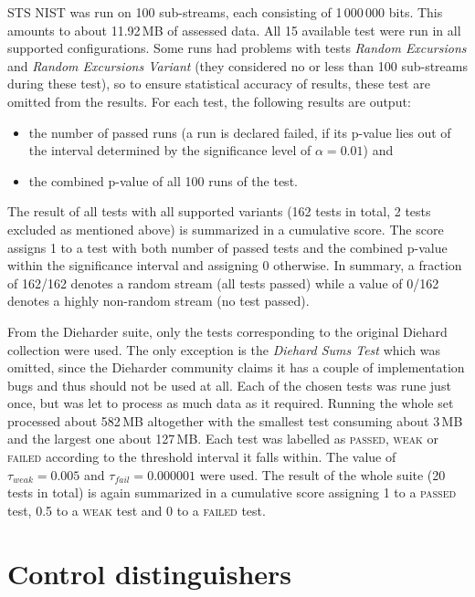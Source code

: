 \documentclass[12pt,oneside]{fithesis2}		%
\renewcommand{\_}{\leavevmode \kern0.0em\vbox{\hrule width0.4em}}
\newcommand{\squarebullet}{\textcolor{black}{\raisebox{0.15em}{\rule{4pt}{4pt}}}}
\newenvironment{myItemize}{
  \begin{itemize}[leftmargin=2em,rightmargin=1em,itemsep=\parskip ,parsep=0em,topsep=0em,partopsep=0em]
  \renewcommand{\labelitemi}{\squarebullet}
  \renewcommand{\labelitemii}{$\diamond$}
}{
  \end{itemize}
}
\begin{document}
STS NIST was run on 100 sub-streams, each consisting of 1\,000\,000 bits. This amounts to about 11.92\,MB of assessed data.
All 15 available test were run in all supported configurations. Some runs had problems with tests \textit{Random Excursions} 
and \textit{Random Excursions Variant} (they considered no or less than 100 sub-streams during these test), 
so to ensure statistical accuracy of results, these test are omitted from the results.
For each test, the following results are output:
\begin{myItemize}
\item the number of passed runs (a run is declared failed, if its p-value lies out of the interval determined by the significance
level of $\alpha = 0.01$) and
\item the combined p-value of all 100 runs of the test.
\end{myItemize}
The result of all tests with all supported variants (162 tests in total, 2 tests excluded as mentioned above) 
is summarized in a cumulative score. The score assigns 1 to a test with both number of passed tests and the
combined p-value within the significance interval and assigning 0 otherwise. 
In summary, a fraction of 162/162 denotes a random stream (all tests passed) while a value of 0/162 denotes a highly non-random
stream (no test passed).

From the Dieharder suite, only the tests corresponding to the original Diehard collection were used.
The only exception is the \textit{Diehard Sums Test} which was omitted, since the Dieharder community claims it has a couple of
implementation bugs and thus should not be used at all. Each of the chosen tests was rune just once, but was let
to process as much data as it required. Running the whole set processed about 582\,MB altogether with the smallest test
consuming about 3\,MB and the largest one about 127\,MB. Each test was labelled as \textsc{passed}, \textsc{weak} or \textsc{failed}
according to the threshold interval it falls within. The value of $\tau_{weak} = 0.005$ and $\tau_{fail} = 0.000001$ were used.
The result of the whole suite (20 tests in total) is again summarized in a cumulative score assigning 1 to a \textsc{passed} test,
0.5 to a \textsc{weak} test and 0 to a \textsc{failed} test.

\chapter{Control distinguishers}
\label{chap:distinguish-control}
\end{document}
